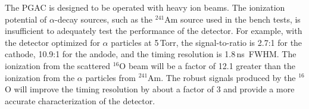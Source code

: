 
The PGAC is designed to be operated with heavy ion beams.  The ionization potential of $\alpha$-decay sources, such as the $^{241}$Am source used in the bench tests,  is insufficient to adequately test the performance of the detector.  For example, with the detector optimized for $\alpha$ particles at 5\,Torr, the signal-to-ratio is %
2.7:1  for the cathode, 10.9:1 for the andode,
 and the timing resolution is 1.8\,ns~FWHM.  %
The ionization from the scattered $^{16}$O beam will be a factor of 12.1 greater than the ionization from the $\alpha$ particles from $^{241}$Am. The robust signals produced by the $^{16}$O will improve the timing resolution by about a factor of 3 and provide a more accurate characterization of the detector.

